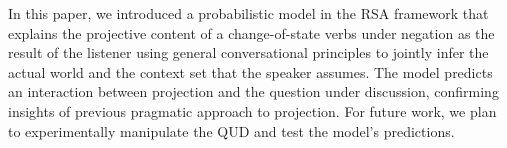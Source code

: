 
In this paper, we introduced a probabilistic model in the RSA framework 
 that explains the projective content of a change-of-state verbs under negation
 as the result of the listener using general conversational principles to jointly infer the actual world and the context set that the speaker assumes.
The model predicts an interaction between projection and the question under discussion, confirming 
 insights of previous pragmatic approach to projection. 
For future work, we plan to experimentally manipulate the QUD and test the model's 
 predictions.
 
